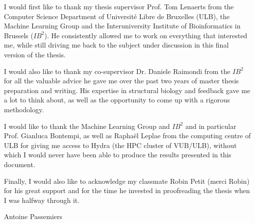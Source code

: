\thispagestyle{empty}

\noindent I would first like to thank my thesis supervisor Prof. Tom Lenaerts from
the Computer Science Department of Université Libre de Bruxelles (ULB),
the Machine Learning Group and the Interuniversity Institute of
Bioinformatics in Brussels ($IB^2$).
He consistently allowed me to work on everything that interested me,
while still driving me back to the subject under discussion in this final
version of the thesis.

\vspace{0.5cm}

\noindent I would also like to thank my co-supervisor Dr. Daniele Raimondi from
the $IB^2$ for all the valuable advice he gave me over the past two years
of master thesis preparation and writing. His expertise in structural
biology and feedback gave me a lot to think about, as well as the opportunity
to come up with a rigorous methodology.

\vspace{0.5cm}

\noindent I would like to thank the Machine Learning Group and $IB^2$ and in particular
Prof. Gianluca Bontempi, as well as Raphaël Leplae from the computing centre
of ULB for giving me access to Hydra (the HPC cluster of VUB/ULB), without
which I would never have been able to produce the results presented in this
document.

\vspace{0.5cm}

\noindent Finally, I would also like to acknowledge my classmate Robin Petit (merci Robin)
for his great support and for the time he invested in proofreading
the thesis when I was halfway through it. 

\vspace{1cm}

Antoine Passemiers
